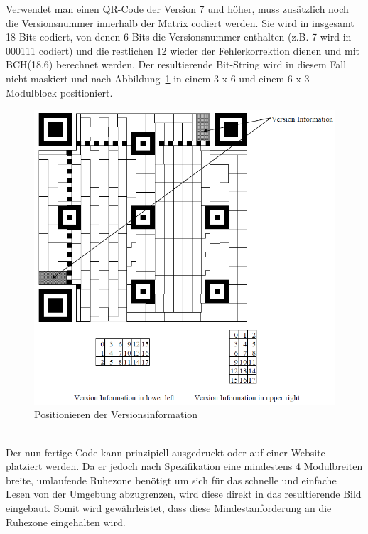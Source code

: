 Verwendet man einen QR-Code der Version 7 und höher, muss zusätzlich noch die Versionsnummer innerhalb der Matrix codiert werden. 
Sie wird in insgesamt 18 Bits codiert, von denen 6 Bits die Versionsnummer enthalten (z.B. 7 wird in 000111 codiert) und die restlichen 12 wieder der Fehlerkorrektion dienen und mit BCH(18,6) berechnet werden. Der resultierende Bit-String wird in diesem Fall nicht maskiert und nach Abbildung~\ref{fig:versioninformationpositioning} in einem 3 x 6 und einem 6 x 3 Modulblock positioniert.\\
\begin{figure}[htbp]
	\centering
	\includegraphics[width=15cm]{Bilder/QR_Version_Information.png}
	\caption[Positionieren der Versionsinformation]{Positionieren der Versionsinformation\footnotemark}
	\label{fig:versioninformationpositioning}
	\hfill
\end{figure}
~\\

Der nun fertige Code kann prinzipiell ausgedruckt oder auf einer Website platziert werden. Da er jedoch nach Spezifikation eine mindestens 4 Modulbreiten breite, umlaufende Ruhezone benötigt um sich für das schnelle und einfache Lesen von der Umgebung abzugrenzen, wird diese direkt in das resultierende Bild eingebaut. Somit wird gewährleistet, dass diese Mindestanforderung an die Ruhezone eingehalten wird.

